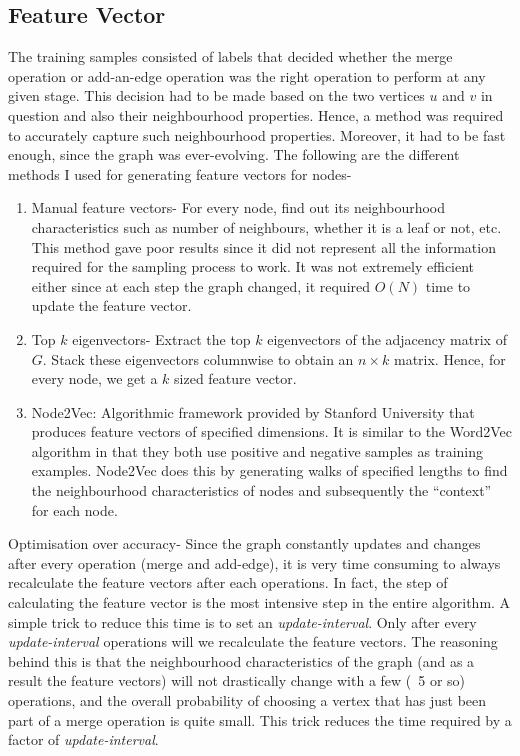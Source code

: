 \documentclass[a4paper]{report}
\begin{document}
\subsection{Feature Vector}
The training samples consisted of labels that decided whether the merge operation
or add-an-edge operation was the right operation to perform at any given stage.
This decision had to be made based on the two vertices $u$ and $v$ in question
and also their neighbourhood properties. Hence, a method was required to accurately
capture such neighbourhood properties. Moreover, it had to be fast enough, since 
the graph was ever-evolving.
The following are the different methods I used for generating feature vectors
for nodes-
\begin{enumerate}
    \item Manual feature vectors- For every node, find out its neighbourhood
        characteristics such as number of neighbours, whether it is a leaf or not,
        etc. This method gave poor results since it did not represent all the
        information required for the sampling process to work. It was not extremely
        efficient either since at each step the graph changed, it required
        $O(N)$ time to update the feature vector.
    \item Top $k$ eigenvectors- Extract the top $k$ eigenvectors of the adjacency
        matrix of $G$. Stack these eigenvectors columnwise to obtain an $n \times k$
        matrix. Hence, for every node, we get a $k$ sized feature vector.
    \item Node2Vec: Algorithmic framework provided by Stanford University that 
        produces feature vectors of specified dimensions. It is similar to the
        Word2Vec algorithm in that they both use positive and negative samples as training examples.
        Node2Vec does this by generating walks of specified lengths to find the 
        neighbourhood characteristics of nodes and subsequently the ``context'' for each node.
\end{enumerate}
Optimisation over accuracy- Since the graph constantly updates and changes after
every operation (merge and add-edge), it is very time consuming to always
recalculate the feature vectors after each operations. In fact, the step of
calculating the feature vector is the most intensive step in the entire algorithm.
A simple trick to reduce this time is to set an \textit{update-interval}. Only after
every \textit{update-interval} operations will we recalculate the feature vectors.
The reasoning behind this is that the neighbourhood characteristics of the graph (and as a result the feature vectors)
will not drastically change with a few (~5 or so) operations, and the overall
probability of choosing a vertex that has just been part of a merge operation
is quite small. This trick reduces the time required by a factor of \textit{update-interval}.
\end{document}
